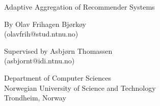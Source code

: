 \null\vspace{4em}
{
\setlength{\parindent}{0em}
\setlength{\parskip}{1em}
\centering

\HUGE
Adaptive Aggregation of Recommender Systems\\
%
%
\vspace{2em}
\HUGE
\aldine
\LARGE
\vspace{1em}
\Large

By Olav Frihagen Bjørkøy\\
(olavfrih@stud.ntnu.no)\\

\vspace{1em}

Supervised by Asbjørn Thomassen\\
(asbjornt@idi.ntnu.no)\\

\vfill

Department of Computer Sciences\\
Norwegian University of Science and Technology\\
Trondheim, Norway\\

}
\cleardoublepage
